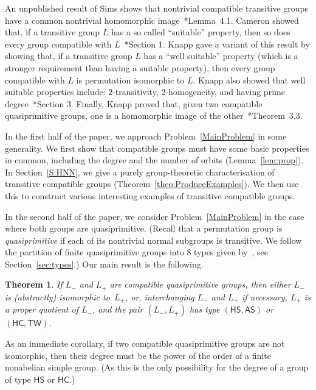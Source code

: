 \documentclass[twoside,12pt,leqno]{amsproc}
\numberwithin{table}{section}
\numberwithin{figure}{section}
\theoremstyle{plain}
\newtheorem{theorem}{Theorem}[section]
\theoremstyle{definition}\newtheorem{definition}[theorem]{Definition}
\theoremstyle{definition}\newtheorem{example}[theorem]{Example}
\theoremstyle{definition}\newtheorem{construction}[theorem]{Construction}
\theoremstyle{definition}\newtheorem{remark}[theorem]{Remark}
\theoremstyle{definition}\newtheorem{problem}[theorem]{Problem}
\begin{document}
An unpublished result of Sims shows that nontrivial compatible transitive groups have a common nontrivial homomorphic image~\cite{Quirin}*{Lemma~4.1}.  Cameron showed that, if a transitive group $L$ has a so called ``suitable'' property, then so does every group compatible with $L$~\cite{Cameron}*{Section 1}. Knapp gave a variant of this result by showing that, if a transitive group $L$ has a ``well suitable'' property (which is a stronger requirement than having a suitable property), then every group compatible with $L$ is permutation isomorphic to $L$. Knapp also showed that well suitable properties include: $2$-transitivity, $2$-homogeneity, and having prime degree~\cite{Knapp}*{Section 3}. Finally, Knapp proved that, given two compatible quasiprimitive groups, one is a homomorphic image of the other~\cite{Knapp}*{Theorem~3.3}.

In the first half of the paper, we approach Problem~\ref{MainProblem} in some generality. We first show that compatible groups must have some basic properties in common, including the degree and the number of orbits (Lemma~\ref{lem:prop}). In Section~\ref{S:HNN}, we give a purely group-theoretic characterisation of transitive compatible groups (Theorem~\ref{theo:ProduceExamples}). We then use this to construct various interesting examples of transitive compatible groups.

In the second half of the paper, we consider Problem~\ref{MainProblem} in the case where both groups are quasiprimitive. (Recall that a permutation group is \emph{quasiprimitive} if each of its nontrivial normal  subgroups is transitive. We follow the partition of finite quasiprimitive groups into $8$ types given by~\cite{P}, see Section~\ref{sec:types}.) Our main result is the following.

\begin{theorem}\label{theo:main2}If $L_-$ and $L_+$ are compatible quasiprimitive groups, then either $L_-$ is (abstractly) isomorphic to~$L_+$, or, interchanging $L_-$ and $L_+$ if necessary, $L_+$ is a proper quotient of  $L_-$, and the pair $(L_-, L_+)$ has type $({\mathsf{HS}},{\mathsf{AS}})$ or~$({\mathsf{HC}},{\mathsf{TW}})$.
\end{theorem}

As an immediate corollary, if two compatible quasiprimitive groups are not isomorphic, then their degree must be the power of the order of a finite nonabelian simple group. (As this is the only possibility for the degree of a group of type ${\mathsf{HS}}$ or ${\mathsf{HC}}$.)
\end{document}
